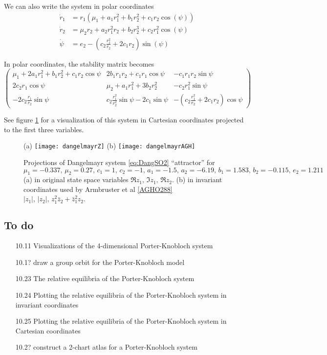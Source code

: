 \documentclass{article}
\begin{document}
We can also write the system in polar coordinates
\begin{align}
\dot{r}_1&=r_1(\mu_1+a_1r_1^2+b_1r_2^2+c_1r_2\cos(\psi))\\
\dot{r}_2&=\mu_2r_2+a_2r_1^2r_2+b_2r_2^3+c_2r_1^2\cos(\psi)\\
\dot{\psi}&=e_2-(c_2\frac{r_1^2}{r_2}+2c_1r_2)\sin(\psi)
\end{align}

In polar coordinates, the stability matrix becomes
\begin{equation}
\left(\begin{array}{ccc}
\mu_1+2a_1r_1^2+b_1r_2^2+c_1r_2\cos\psi & 2b_1r_1r_2+c_1r_1\cos\psi & -c_1r_1r_2\sin\psi\\
2c_2r_1\cos\psi & \mu_2+a_1r_1^2+3b_2r_2^2 & -c_2r_1^2\sin\psi\\
-2c_2\frac{r_1}{r_2}\sin\psi & c_2\frac{r_1^2}{r_2^2}\sin\psi-2c_1\sin\psi & -(c_2\frac{r_1^2}{r_2}+2c_1r_2)\cos\psi
\end{array}\right)
\end{equation}

See figure \ref{fig:dangelmayrChaos} for a visualization of this system in Cartesian coordinates projected to the first three variables.
\begin{figure}
\centering
 (a) \texttt{[image: dangelmayrZ]}
 (b) \texttt{[image: dangelmayrAGH]}
\caption{Projections of Dangelmayr system \ref{eq:DangSO2}
``attractor'' for $\mu_1 = -0.337,\, \mu_2 = 0.27,\, c_1 = 1,\, c_2 =
-1,\, a_1 = -1.5,\, a_2 = -6.19,\, b_1 = 1.583,\,  b_2 = -0.115,\, e_2 =
1.211$
(a) in original state space variables $\Re z_1,\,\Im z_1,\,\Re z_2$.
(b) in invariant coordinates used by
Armbruster et al \ref{AGHO288} $|z_1|,\, |z_2|,\, z_1^2 \bar{z}_2 + \bar{z}_1^2 z_2$.
}
 \label{fig:dangelmayrChaos}
\end{figure}

\subsection{To do}
\label{s:ToDo}

\begin{itemize}

  \item[10.11] Visualizations of the 4-dimensional Porter-Knobloch system
  \item[10.1?] draw a group orbit for the Porter-Knobloch model
  \item[10.23] The relative equilibria of the Porter-Knobloch system
  \item[10.24] Plotting the relative equilibria of
           the Porter-Knobloch system in invariant coordinates
  \item[10.25] Plotting the relative equilibria of
           the Porter-Knobloch system in Cartesian coordinates
  \item[10.2?] construct a 2-chart atlas for a Porter-Knobloch system
\end{itemize}
\end{document}
